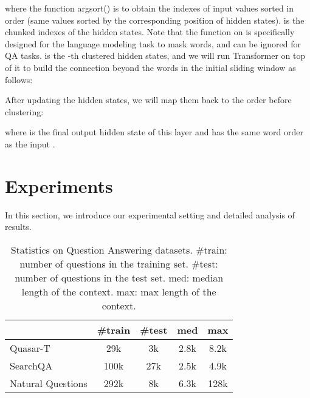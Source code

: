 \documentclass[11pt,a4paper]{article}
\begin{document}
where the function argsort() is to obtain the indexes of input values sorted in order (same values sorted by the corresponding position of hidden states).
 is the chunked indexes of the hidden states.
Note that the function  on  is specifically designed for the language modeling task to mask words, and can be ignored for QA tasks.
 is the -th clustered hidden states, and we will run Transformer on top of it to build the connection beyond the words in the initial sliding window as follows:

After updating the hidden states, we will map them back to the order before clustering:

where  is the final output hidden state of this layer and has the same word order as the input .



\begin{comment}
where  is the hidden state in the n-th layer.
 is the norm2 value of each row of the input matrix. 
The function argmax(\cdot) is to obtain the position of the max value in each row.
 are the assigned cluster IDs for all the  hidden states.
The function sort(\cdot) sorts the values of the input vector.
 re-orders the hidden states  based on the index order of .
 is the re-ordered hidden states and will be chunked into shorter sequences as follows:


where  is the window size of each chunk and  is the index of the chunk.
Each chucked sequence will be encoded by Transformer into another Transformer layer . These hidden states will be concatenated and mapped back to the original order before clustering based on the sorted index
.
\end{comment} \section{Experiments}
In this section, we introduce our experimental setting and detailed analysis of results.
\begin{table}[t]
\begin{tabular}{lcccc}
\toprule
                 & \#train & \#test & med  & max  \\
\midrule
Quasar-T         & 29k     & 3k     & 2.8k    & 8.2k    \\
SearchQA         & 100k    & 27k    & 2.5k    & 4.9k    \\
Natural Questions & 292k    & 8k     & 6.3k    & 128k    \\
\bottomrule
\end{tabular}
\caption{Statistics on Question Answering datasets. \#train: number of questions in the training set. \#test: number of questions in the test set. med: median length of the context. max: max length of the context. }
\label{tbl:sts}
\end{table}
\end{document}
